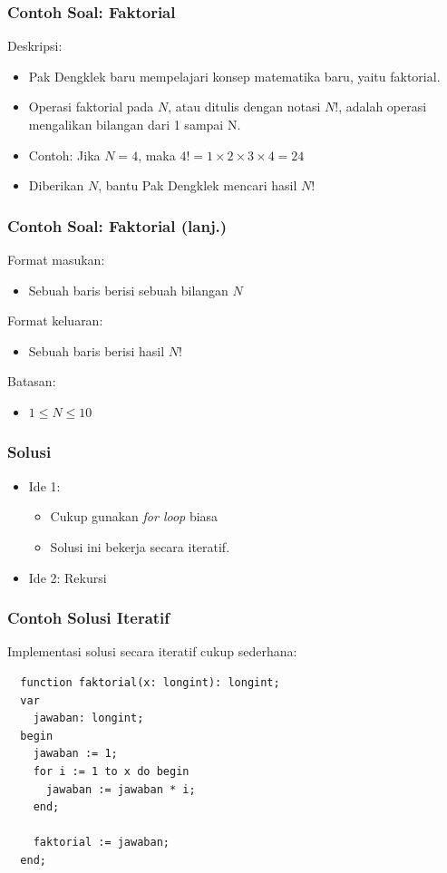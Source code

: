\begin{frame}
\frametitle{Contoh Soal: Faktorial}
Deskripsi:
\begin{itemize}
  \item Pak Dengklek baru mempelajari konsep matematika baru, yaitu faktorial.
  \item Operasi faktorial pada $N$, atau ditulis dengan notasi $N$!, adalah operasi mengalikan bilangan dari 1 sampai N.
  \item Contoh: Jika $N = 4$, maka $4! = 1 \times 2 \times 3 \times 4 = 24$
  \item Diberikan $N$, bantu Pak Dengklek mencari hasil $N$!
\end{itemize}
\end{frame}

\begin{frame}
\frametitle{Contoh Soal: Faktorial (lanj.) }
Format masukan:
\begin{itemize}
  \item Sebuah baris berisi sebuah bilangan $N$
\end{itemize}
Format keluaran:
\begin{itemize}
  \item Sebuah baris berisi hasil $N$!
\end{itemize}
Batasan:
\begin{itemize}
  \item $1 \le N \le 10$
\end{itemize}
\end{frame}

\begin{frame}
\frametitle{Solusi}
\begin{itemize}
  \item Ide 1:
  \begin{itemize}
    \item Cukup gunakan \textit{for loop} biasa
    \item Solusi ini bekerja secara iteratif.
  \end{itemize}
  \item Ide 2: Rekursi 
\end{itemize}
\end{frame}

\begin{frame}[fragile]
\frametitle{Contoh Solusi Iteratif}
Implementasi solusi secara iteratif cukup sederhana:
\begin{lstlisting}    
  function faktorial(x: longint): longint;
  var
    jawaban: longint;
  begin
    jawaban := 1; 
    for i := 1 to x do begin
      jawaban := jawaban * i;
    end;
    
    faktorial := jawaban;
  end;
\end{lstlisting}
\end{frame}

